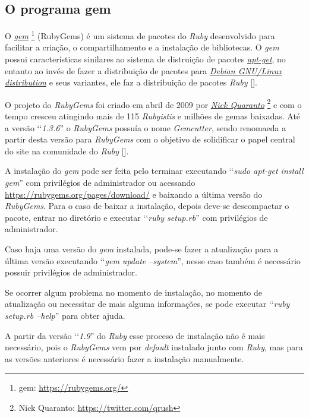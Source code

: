 \subsection{O programa gem}
\label{subsection:gem}

O \emph{\href{https://rubygems.org/}{gem}} \footnote{gem: \url{https://rubygems.org/}} (RubyGems) é um sistema
de pacotes do \emph{Ruby} desenvolvido para facilitar a criação, o compartilhamento e a instalação de
bibliotecas. O \emph{gem} possui características sinilares ao sistema de distruição de pacotes
\emph{\href{https://packages.qa.debian.org/a/apt.html}{apt-get}}, no entanto ao invés de fazer a distribuição
de pacotes para \emph{\href{https://www.debian.org/}{Debian GNU/Linux distribution}} e seus variantes, ele faz
a distribuição de pacotes \emph{Ruby} [].

O projeto do \emph{RubyGems} foi criado em abril de 2009 por \emph{\href{https://twitter.com/qrush}{Nick Quaranto}}
\footnote{Nick Quaranto: \url{https://twitter.com/qrush}} e com o tempo cresceu atingindo mais de 115
\emph{Rubyistis} e milhões de gemas baixadas. Até a versão ‘‘\emph{1.3.6}'' o \emph{RubyGems} possuía o nome
\emph{Gemcutter}, sendo renomaeda a partir desta versão para \emph{RubyGems} com o objetivo de
solidificar o papel central do site na comunidade do \emph{Ruby} [].

A instalação do \emph{gem} pode ser feita pelo terminar executando ‘‘\emph{sudo apt-get install gem}'' com
privilégios de administrador ou acessando \url{https://rubygems.org/pages/download/} e baixando a última
versão do \emph{RubyGems}. Para o caso de baixar a instalação, depois deve-se descompactar o pacote, entrar
no diretório e executar ‘‘\emph{ruby setup.rb}'' com privilégios de administrador.

Caso haja uma versão do \emph{gem} instalada, pode-se fazer a atualização para a última versão executando
‘‘\emph{gem update --system}'', nesse caso também é necessário possuir privilégios de administrador.

Se ocorrer algum problema no momento de instalação, no momento de atualização ou necessitar de mais
alguma informações, se pode executar ‘‘\emph{ruby setup.rb --help}'' para obter ajuda.

A partir da versão ‘‘\emph{1.9}'' do \emph{Ruby} esse proceso de instalação não é mais necessário, pois o
\emph{RubyGems} vem por \emph{default} instalado junto com \emph{Ruby}, mas para as versões anteriores
é necessário fazer a instalação manualmente.

